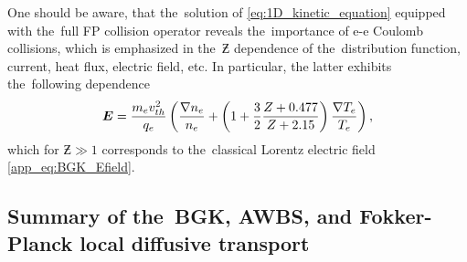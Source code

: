 One should be aware, that the~solution of \eqref{eq:1D_kinetic_equation}
equipped with the~full FP collision operator reveals the~importance of
e-e Coulomb collisions, which is emphasized in the~$\Zbar$ dependence 
of the~distribution function, current, heat flux, electric field, etc.
In particular, the latter exhibits the~following dependence 
\cite{SpitzerHarm_PR1953}
\begin{equation}
  \boldsymbol{E} = \frac{m_e v_{th}^2}{q_e}
  \left(\frac{\nabla n_e}{n_e} + 
  \left(1 + \frac{3}{2}\frac{Z + 0.477}{Z + 2.15} \right)
  \frac{\nabla T_e}{T_e} \right),
  \label{eq:SH_Efield} 
\end{equation}
which for $\Zbar\gg1$ corresponds to the~classical Lorentz electric field 
\eqref{app_eq:BGK_Efield}.


\subsection{Summary of the~BGK, AWBS, and Fokker-Planck local diffusive 
transport}
\label{sec:SummaryDiffusiveKinetics}

